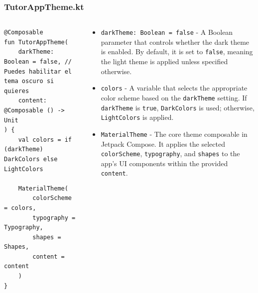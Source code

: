 \documentclass[pdf,
serif,
compress,
xcolor=table,
dvipsnames,
spanish,
aspectratio=169]{beamer}
\begin{document}

\begin{frame}[fragile]
    \frametitle{TutorAppTheme.kt}
\begin{columns}
\begin{verbatim}
@Composable
fun TutorAppTheme(
    darkTheme: Boolean = false, // Puedes habilitar el tema oscuro si quieres
    content: @Composable () -> Unit
) {
    val colors = if (darkTheme) DarkColors else LightColors

    MaterialTheme(
        colorScheme = colors,
        typography = Typography,
        shapes = Shapes,
        content = content
    )
}
\end{verbatim}

\begin{itemize}\tiny
    \begin{itemize}\tiny
        \item \texttt{darkTheme: Boolean = false} - A Boolean parameter that controls whether the dark theme is enabled. By default, it is set to \texttt{false}, meaning the light theme is applied unless specified otherwise.
        \item \texttt{colors} - A variable that selects the appropriate color scheme based on the \texttt{darkTheme} setting. If \texttt{darkTheme} is \texttt{true}, \texttt{DarkColors} is used; otherwise, \texttt{LightColors} is applied.
        \item \texttt{MaterialTheme} - The core theme composable in Jetpack Compose. It applies the selected \texttt{colorScheme}, \texttt{typography}, and \texttt{shapes} to the app's UI components within the provided \texttt{content}.
    \end{itemize}
\end{itemize}

\end{columns}
\end{frame}

\end{document}

